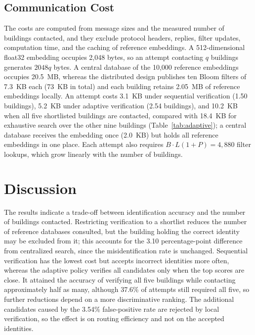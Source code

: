 \documentclass[pdflatex,sn-mathphys-num]{sn-jnl}%
\theoremstyle{thmstyleone}%
\theoremstyle{thmstyletwo}%
\theoremstyle{thmstylethree}%
\begin{document}
\subsection{Communication Cost}
\label{sec:cost}

The costs are computed from message sizes and the measured number of buildings contacted, and they exclude protocol headers, replies, filter updates, computation time, and the caching of reference embeddings. A 512-dimensional float32 embedding occupies 2,048 bytes, so an attempt contacting $q$ buildings generates $2048q$ bytes. A central database of the 10,000 reference embeddings occupies 20.5~MB, whereas the distributed design publishes ten Bloom filters of 7.3~KB each (73~KB in total) and each building retains 2.05~MB of reference embeddings locally. An attempt costs 3.1~KB under sequential verification (1.50 buildings), 5.2~KB under adaptive verification (2.54 buildings), and 10.2~KB when all five shortlisted buildings are contacted, compared with 18.4~KB for exhaustive search over the other nine buildings (Table~\ref{tab:adaptive}); a central database receives the embedding once (2.0~KB) but holds all reference embeddings in one place. Each attempt also requires $B\cdot L(1+P)=4{,}880$ filter lookups, which grow linearly with the number of buildings.


\section{Discussion}
\label{sec:discussion}

The results indicate a trade-off between identification accuracy and the number of buildings contacted. Restricting verification to a shortlist reduces the number of reference databases consulted, but the building holding the correct identity may be excluded from it; this accounts for the 3.10 percentage-point difference from centralized search, since the misidentification rate is unchanged. Sequential verification has the lowest cost but accepts incorrect identities more often, whereas the adaptive policy verifies all candidates only when the top scores are close. It attained the accuracy of verifying all five buildings while contacting approximately half as many, although 37.6\% of attempts still required all five, so further reductions depend on a more discriminative ranking. The additional candidates caused by the 3.54\% false-positive rate are rejected by local verification, so the effect is on routing efficiency and not on the accepted identities.
\end{document}
